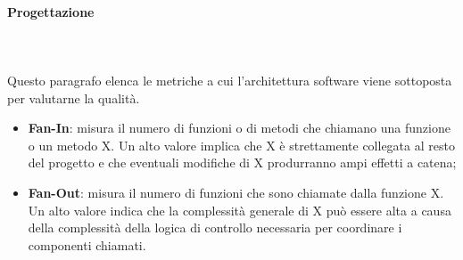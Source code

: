 			\paragraph{Progettazione}\mbox{} \\ \mbox{} \\
			Questo paragrafo elenca le metriche a cui l'architettura software viene sottoposta per valutarne la qualità.
			\begin{itemize}
						\item \textbf{Fan-In}: misura il numero di funzioni o di metodi che chiamano una funzione o un metodo X. Un alto valore implica che X è strettamente collegata al resto del progetto e che eventuali modifiche di X produrranno ampi effetti a catena;
		\item \textbf{Fan-Out}: misura il numero di funzioni che sono chiamate dalla funzione X. Un alto valore indica che la complessità generale di X può essere alta a causa della complessità della logica di controllo necessaria per coordinare i componenti chiamati.
			\end{itemize}
